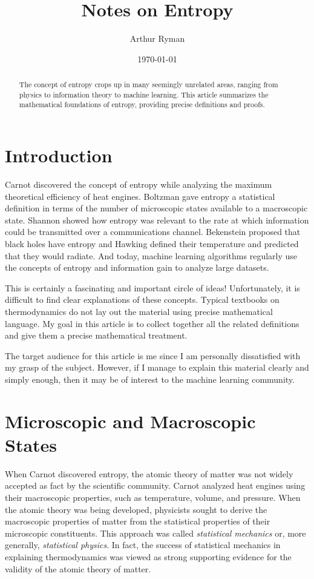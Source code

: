 \documentclass[11pt]{amsart}
\title{Notes on Entropy}
\author{Arthur Ryman}
\date{\today}                                           %
\begin{document}
\begin{abstract}
The concept of entropy crops up in many seemingly unrelated areas, ranging from physics to information theory to
machine learning.
This article summarizes the mathematical foundations of entropy, providing precise definitions and proofs.
\end{abstract}

\maketitle

\section{Introduction}

Carnot discovered the concept of entropy while analyzing the maximum theoretical efficiency of heat engines.
Boltzman gave entropy a statistical definition in terms of the number of microscopic states available to a macroscopic state.
Shannon showed how entropy was relevant to the rate at which information could be transmitted over a communications channel.
Bekenstein proposed that black holes have entropy and Hawking defined their temperature and predicted that they would radiate.
And today, machine learning algorithms regularly use the concepts of entropy and information gain to analyze large datasets.

This is certainly a fascinating and important circle of ideas!
Unfortunately, it is difficult to find clear explanations of these concepts.
Typical textbooks on thermodynamics do not lay out the material using precise mathematical language.
My goal in this article is to collect together all the related definitions and give them a precise mathematical treatment.

The target audience for this article is me since I am personally dissatisfied with my grasp of the subject.
However, if I manage to explain this material clearly and simply enough, then it may be of interest to the machine learning community.

\section{Microscopic and Macroscopic States}

When Carnot discovered entropy, the atomic theory of matter was not widely accepted as fact by the scientific community.
Carnot analyzed heat engines using their macroscopic properties, such as temperature, volume, and pressure.
When the atomic theory was being developed, physicists sought to derive the macroscopic properties of matter from 
the statistical properties of their microscopic constituents.
This approach was called {\it statistical mechanics} or, more generally, {\it statistical physics}.
In fact, the success of statistical mechanics in explaining thermodynamics was viewed as strong supporting evidence for the 
validity of the atomic theory of matter.
\end{document}
